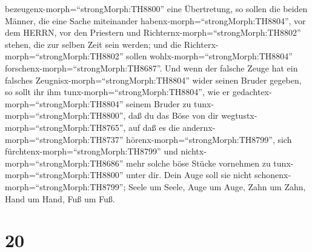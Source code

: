 bezeugenx-morph=``strongMorph:TH8800'' eine Übertretung, 
so sollen die beiden Männer, die eine Sache miteinander
habenx-morph=``strongMorph:TH8804'', vor dem HERRN, vor den Priestern
und Richternx-morph=``strongMorph:TH8802'' stehen, die zur selben Zeit
sein werden;  und die Richterx-morph=``strongMorph:TH8802''
sollen wohlx-morph=``strongMorph:TH8804''
forschenx-morph=``strongMorph:TH8687''. Und wenn der falsche Zeuge hat
ein falsches Zeugnisx-morph=``strongMorph:TH8804'' wider seinen Bruder
gegeben,  so sollt ihr ihm
tunx-morph=``strongMorph:TH8804'', wie er
gedachtex-morph=``strongMorph:TH8804'' seinem Bruder zu
tunx-morph=``strongMorph:TH8800'', daß du das Böse von dir
wegtustx-morph=``strongMorph:TH8765'',  auf daß es die
andernx-morph=``strongMorph:TH8737''
hörenx-morph=``strongMorph:TH8799'', sich
fürchtenx-morph=``strongMorph:TH8799'' und
nichtx-morph=``strongMorph:TH8686'' mehr solche böse Stücke vornehmen zu
tunx-morph=``strongMorph:TH8800'' unter dir.  Dein Auge
soll sie nicht schonenx-morph=``strongMorph:TH8799''; Seele um Seele,
Auge um Auge, Zahn um Zahn, Hand um Hand, Fuß um Fuß.

\hypertarget{section-19}{%
\section{20}\label{section-19}}

